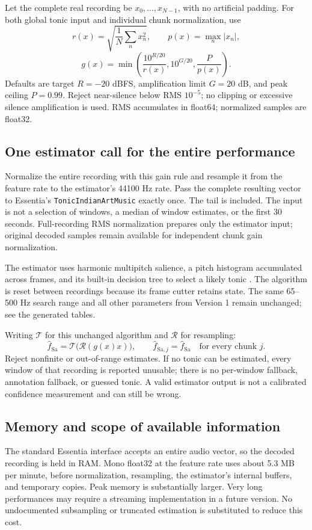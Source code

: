 \documentclass[11pt,a4paper]{article}
\begin{document}
Let the complete real recording be $x_0,\ldots,x_{N-1}$, with no artificial
padding. For both global tonic input and individual chunk normalization, use
\[
r(x)=\sqrt{\frac1N\sum_n x_n^2},\qquad p(x)=\max_n|x_n|,
\]
\[
g(x)=\min\left(\frac{10^{R/20}}{r(x)},10^{G/20},\frac{P}{p(x)}\right).
\]
Defaults are target $R=-20$ dBFS, amplification limit $G=20$ dB, and peak ceiling
$P=0.99$. Reject near-silence below RMS $10^{-5}$; no clipping or excessive silence
amplification is used. RMS accumulates in float64; normalized samples are float32.

\subsection{One estimator call for the entire performance}
Normalize the entire recording with this gain rule and resample it from the
feature rate to the estimator's 44100 Hz rate. Pass the complete resulting vector
to Essentia's \texttt{TonicIndianArtMusic} exactly once. The tail is included.
The input is not a selection of windows, a median of window estimates, or the
first 30 seconds. Full-recording RMS normalization prepares only the estimator
input; original decoded samples remain available for independent chunk gain
normalization.

The estimator uses harmonic multipitch salience, a pitch histogram accumulated
across frames, and its built-in decision tree to select a likely tonic
\cite{tonic,essentia}. The algorithm is reset between recordings because its frame
cutter retains state. The same 65--500 Hz search range and all other parameters
from Version 1 remain unchanged; see the generated tables.

Writing $\mathcal T$ for this unchanged algorithm and $\mathcal R$ for resampling:
\[
\widehat f_{\mathrm{Sa}}=\mathcal T\bigl(\mathcal R(g(x)x)\bigr),\qquad
\widehat f_{\mathrm{Sa},j}=\widehat f_{\mathrm{Sa}}\quad\text{for every chunk }j.
\]
Reject nonfinite or out-of-range estimates. If no tonic can be estimated, every
window of that recording is reported unusable; there is no per-window fallback,
annotation fallback, or guessed tonic. A valid estimator output is not a
calibrated confidence measurement and can still be wrong.

\subsection{Memory and scope of available information}
The standard Essentia interface accepts an entire audio vector, so the decoded
recording is held in RAM. Mono float32 at the feature rate uses about 5.3 MB per
minute, before normalization, resampling, the estimator's internal buffers, and
temporary copies. Peak memory is substantially larger. Very long performances
may require a streaming implementation in a future version. No undocumented
subsampling or truncated estimation is substituted to reduce this cost.
\end{document}
